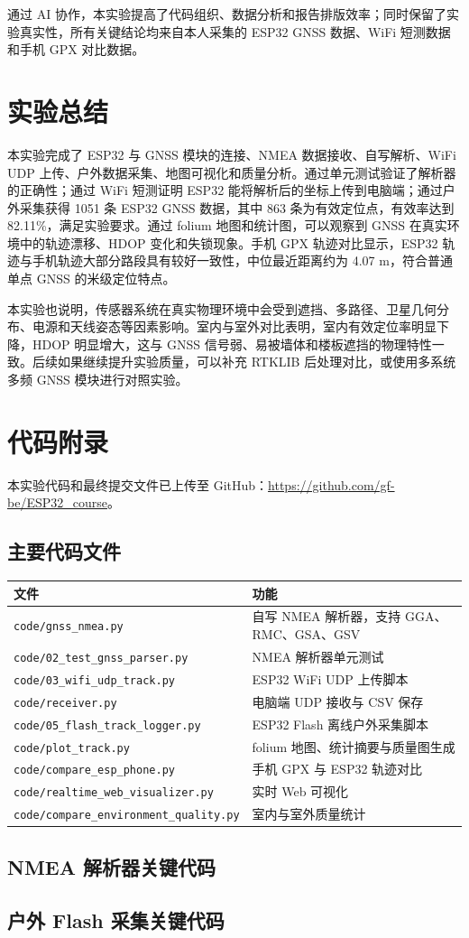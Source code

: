 \documentclass[UTF8,a4paper,12pt]{ctexart}
\begin{document}
通过 AI 协作，本实验提高了代码组织、数据分析和报告排版效率；同时保留了实验真实性，所有关键结论均来自本人采集的 ESP32 GNSS 数据、WiFi 短测数据和手机 GPX 对比数据。

\section{实验总结}
本实验完成了 ESP32 与 GNSS 模块的连接、NMEA 数据接收、自写解析、WiFi UDP 上传、户外数据采集、地图可视化和质量分析。通过单元测试验证了解析器的正确性；通过 WiFi 短测证明 ESP32 能将解析后的坐标上传到电脑端；通过户外采集获得 1051 条 ESP32 GNSS 数据，其中 863 条为有效定位点，有效率达到 82.11\%，满足实验要求。通过 folium 地图和统计图，可以观察到 GNSS 在真实环境中的轨迹漂移、HDOP 变化和失锁现象。手机 GPX 轨迹对比显示，ESP32 轨迹与手机轨迹大部分路段具有较好一致性，中位最近距离约为 4.07 m，符合普通单点 GNSS 的米级定位特点。

本实验也说明，传感器系统在真实物理环境中会受到遮挡、多路径、卫星几何分布、电源和天线姿态等因素影响。室内与室外对比表明，室内有效定位率明显下降，HDOP 明显增大，这与 GNSS 信号弱、易被墙体和楼板遮挡的物理特性一致。后续如果继续提升实验质量，可以补充 RTKLIB 后处理对比，或使用多系统多频 GNSS 模块进行对照实验。

\clearpage
\appendix
\section{代码附录}
本实验代码和最终提交文件已上传至 GitHub：\url{https://github.com/gf-be/ESP32_course}。

\subsection{主要代码文件}
\begin{longtable}{p{}p{}}
\toprule
文件 & 功能 \\
\midrule
\verb|code/gnss_nmea.py| & 自写 NMEA 解析器，支持 GGA、RMC、GSA、GSV \\
\verb|code/02_test_gnss_parser.py| & NMEA 解析器单元测试 \\
\verb|code/03_wifi_udp_track.py| & ESP32 WiFi UDP 上传脚本 \\
\verb|code/receiver.py| & 电脑端 UDP 接收与 CSV 保存 \\
\verb|code/05_flash_track_logger.py| & ESP32 Flash 离线户外采集脚本 \\
\verb|code/plot_track.py| & folium 地图、统计摘要与质量图生成 \\
\verb|code/compare_esp_phone.py| & 手机 GPX 与 ESP32 轨迹对比 \\
\verb|code/realtime_web_visualizer.py| & 实时 Web 可视化 \\
\verb|code/compare_environment_quality.py| & 室内与室外质量统计 \\
\bottomrule
\end{longtable}

\subsection{NMEA 解析器关键代码}


\subsection{户外 Flash 采集关键代码}

\end{document}
